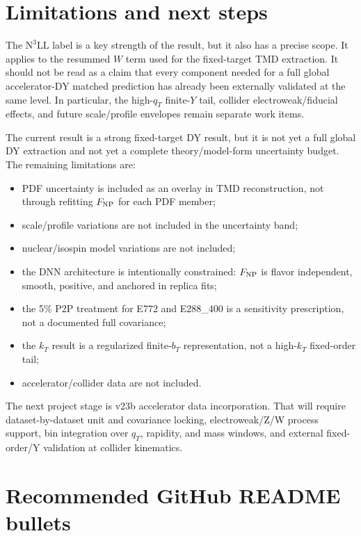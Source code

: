 \documentclass[11pt]{article}
\newcommand{\bt}{b_T}
\newcommand{\kt}{k_T}
\newcommand{\qT}{q_T}
\newcommand{\FNP}{F_{\rm NP}}
\newcommand{\NthreeLL}{\mathrm{N^{3}LL}}
\begin{document}
\section{Limitations and next steps}


The $\NthreeLL$ label is a key strength of the result, but it also has a precise scope.  It applies to the resummed $W$ term used for the fixed-target TMD extraction.  It should not be read as a claim that every component needed for a full global accelerator-DY matched prediction has already been externally validated at the same level.  In particular, the high-$\qT$ finite-$Y$ tail, collider electroweak/fiducial effects, and future scale/profile envelopes remain separate work items.

The current result is a strong fixed-target DY result, but it is not yet a full global DY extraction and not yet a complete theory/model-form uncertainty budget.  The remaining limitations are:
\begin{itemize}
  \item PDF uncertainty is included as an overlay in TMD reconstruction, not through refitting $\FNP$ for each PDF member;
  \item scale/profile variations are not included in the uncertainty band;
  \item nuclear/isospin model variations are not included;
  \item the DNN architecture is intentionally constrained: $\FNP$ is flavor independent, smooth, positive, and anchored in replica fits;
  \item the 5\% P2P treatment for E772 and E288\_400 is a sensitivity prescription, not a documented full covariance;
  \item the $\kt$ result is a regularized finite-$\bt$ representation, not a high-$\kt$ fixed-order tail;
  \item accelerator/collider data are not included.
\end{itemize}

The next project stage is v23b accelerator data incorporation.  That will require dataset-by-dataset unit and covariance locking, electroweak/Z/W process support, bin integration over $\qT$, rapidity, and mass windows, and external fixed-order/Y validation at collider kinematics.

\appendix
\section{Recommended GitHub README bullets}
\end{document}
